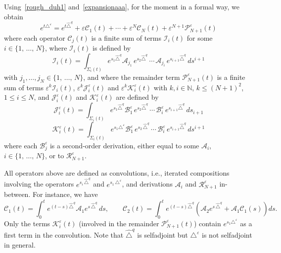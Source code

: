 \documentclass[10pt]{amsart}
\theoremstyle{definition}\newtheorem{defi}[theo]{Definition}\newtheorem{rema}[theo]{Remark}\newtheorem{exam}[theo]{Example}\newtheorem{exem}[theo]{Example}\newtheorem{nota}[theo]{Notation}
\newcommand*\N{\mathbb{N}}
\newcommand{\calK}{\mathcal{K}}
\newcommand{\calA}{\mathcal{A}}
\newcommand{\calR}{\mathcal{R}}
\newcommand{\calC}{\mathcal{C}}
\newcommand{\calI}{\mathcal{I}}
\newcommand{\calP}{\mathcal{P}}
\newcommand{\calJ}{\mathcal{J}}
\newcommand{\calB}{\mathcal{B}}
\renewcommand{\leq}{\leqslant}
\begin{document}
Using~\eqref{rough_duh1} and~\eqref{expansionaaa}, for the moment in a formal way, we obtain
\begin{equation}\label{rough_duhamel2}
e^{t\triangle^\varepsilon} = e^{t \widehat{\triangle}^{q}} + \varepsilon\calC_1(t) + \cdots + \varepsilon^N \calC_N(t) + \varepsilon^{N+1} \calP_{N+1}^\varepsilon(t)
\end{equation}
where each operator $\calC_j(t)$ is a finite sum of terms $\calI_i(t)$ for some $i\in\{1,\,\ldots,\,N\}$, where $\calI_i(t)$ is defined by
\begin{equation}\label{def_mathcal_Ii}
\calI_i(t) = \int_{\Sigma_i(t)} e^{s_1 \widehat{\triangle}^{q}} \calA_{j_1} \, e^{s_2 \widehat{\triangle}^{q}}\,\cdots\, \calA_{j_i} \, e^{s_{i+1} \widehat{\triangle}^{q}} \, ds^{i+1}
\end{equation}
with $j_1,\ldots,j_N\in\{1,\,\ldots,\,N\}$, and where the remainder term $\calP_{N+1}^\varepsilon(t)$ is a finite sum of terms $\varepsilon^k\calI_i(t)$, $\varepsilon^k\calJ_i^\varepsilon(t)$ and $\varepsilon^k\calK_i^\varepsilon(t)$ with $k,i\in\N$, $k\leq (N+1)^2$, $1\leq i\leq N$, and $\calJ_i^\varepsilon(t)$ and $\calK_i^\varepsilon(t)$ are defined by
\begin{equation}\label{def_mathcal_Jieps}
\calJ_i^\varepsilon(t) = \int_{\Sigma_i(t)} e^{s_1 \widehat{\triangle}^{q}} \calB_{1}^\varepsilon \, e^{s_2 \widehat{\triangle}^{q}}\,\cdots\,\calB_i^\varepsilon \, e^{s_{i+1} \widehat{\triangle}^{q}} \, ds_{i+1}
\end{equation}
\begin{equation}\label{def_mathcal_Kieps}
\calK_i^\varepsilon(t) = \int_{\Sigma_i(t)} e^{s_1 \triangle^\varepsilon} \calB_{1}^\varepsilon \, e^{s_2\,\widehat{\triangle}^{q}}\,\cdots\,\calB_i^\varepsilon \, e^{s_{i+1} \widehat{\triangle}^{q}} \, ds^{i+1}
\end{equation}
where each $\calB_{j}^\varepsilon$ is a second-order derivation, either equal to some $\calA_i$, $i\in\{1,\,\ldots,\,N\}$, or to $\calR_{N+1}^\varepsilon$.

All operators above are defined as convolutions, i.e., iterated compositions involving the operators $e^{s_i\,\widehat{\triangle}^{q}}$ and $e^{s_1\,\triangle^\varepsilon}$, and derivations $\calA_i$ and $\calR_{N+1}^\varepsilon$ in-between. For instance, we have
\[
\calC_1(t) = \int_0^t e^{(t-s)\widehat{\triangle}^{q}} \calA_1 e^{s\,\widehat{\triangle}^{q}}\, ds,
\qquad
\calC_2(t) = \int_0^t e^{(t-s)\widehat{\triangle}^{q}} \left(\calA_2 e^{s\,\widehat{\triangle}^{q}} + \calA_1 \calC_1(s) \right) ds.
\]
Only the terms $\calK_i^\varepsilon(t)$ (involved in the remainder $\calP_{N+1}^\varepsilon(t)$) contain $e^{s_1 \triangle^\varepsilon}$ as a first term in the convolution. Note that $\widehat{\triangle}^{q}$ is selfadjoint but $\triangle^\varepsilon$ is not selfadjoint in general.
\end{document}
